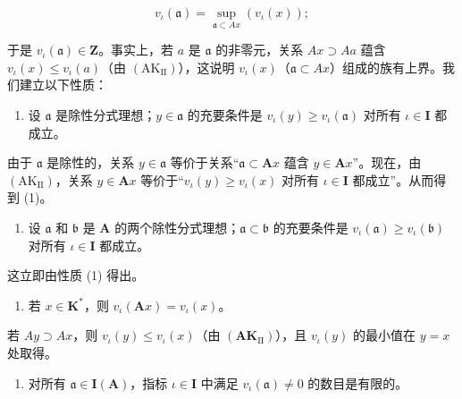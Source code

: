 \[
v _ {\iota} (\mathfrak{a}) = \sup _ {\mathfrak{a} \subset Ax} (v _ {\iota} (x));\tag{3}
\]

于是 \(v_{\iota}(\mathfrak{a}) \in \mathbf{Z}\)。事实上，若 \(a\) 是 \(\mathfrak{a}\) 的非零元，关系 \(Ax \supset Aa\) 蕴含 \(v_{\iota}(x) \leqslant v_{\iota}(a)\)（由 \((\mathrm{AK}_{\mathrm{II}})\)），这说明 \(v_{\iota}(x)\)（\(\mathfrak{a} \subset Ax\)）组成的族有上界。我们建立以下性质：

\begin{enumerate}
\def\labelenumi{(\arabic{enumi})}
\tightlist
\item
  设 \(\mathfrak{a}\) 是除性分式理想；\(y \in \mathfrak{a}\) 的充要条件是 \(v_{\iota}(y) \geqslant v_{\iota}(\mathfrak{a})\) 对所有 \(\iota \in \mathbf{I}\) 都成立。
\end{enumerate}

由于 \(\mathfrak{a}\) 是除性的，关系 \(y \in \mathfrak{a}\) 等价于关系“\(\mathfrak{a} \subset \mathbf{A}x\) 蕴含 \(y \in \mathbf{A}x\)”。现在，由 \((\mathrm{AK}_{\mathrm{II}})\)，关系 \(y \in \mathbf{A}x\) 等价于“\(v_{\iota}(y) \geqslant v_{\iota}(x)\) 对所有 \(\iota \in \mathbf{I}\) 都成立”。从而得到 (1)。

\begin{enumerate}
\def\labelenumi{(\arabic{enumi})}
\setcounter{enumi}{1}
\tightlist
\item
  设 \(\mathfrak{a}\) 和 \(\mathfrak{b}\) 是 \(\mathbf{A}\) 的两个除性分式理想；\(\mathfrak{a} \subset \mathfrak{b}\) 的充要条件是 \(v_{\iota}(\mathfrak{a}) \geqslant v_{\iota}(\mathfrak{b})\) 对所有 \(\iota \in \mathbf{I}\) 都成立。
\end{enumerate}

这立即由性质 (1) 得出。

\begin{enumerate}
\def\labelenumi{(\arabic{enumi})}
\setcounter{enumi}{2}
\tightlist
\item
  若 \(x \in \mathbf{K}^*\)，则 \(v_{\iota}(\mathbf{A}x) = v_{\iota}(x)\)。
\end{enumerate}

若 \(A y \supset A x\)，则 \(v_{\iota}(y) \leqslant v_{\iota}(x)\)（由 \((\mathbf{A K}_{\mathrm{II}})\)），且 \(v_{\iota}(y)\) 的最小值在 \(y = x\) 处取得。

\begin{enumerate}
\def\labelenumi{(\arabic{enumi})}
\setcounter{enumi}{3}
\tightlist
\item
  对所有 \(\mathfrak{a} \in \mathbf{I}(\mathbf{A})\)，指标 \(\iota \in \mathbf{I}\) 中满足 \(v_{\iota}(\mathfrak{a}) \neq 0\) 的数目是有限的。
\end{enumerate}

